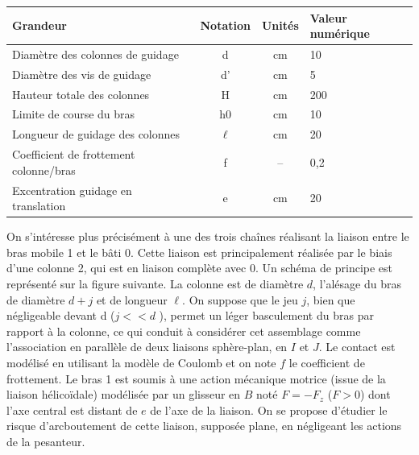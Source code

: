 \documentclass[10pt,fleqn]{article} %
\begin{document}

\vspace{5cm}
\pagestyle{fancy}
\thispagestyle{plain}


\def\columnseprulecolor{\color{ocre}}
\setlength{\columnseprule}{0.4pt} 

\begin{multicols}{2}

\footnotesize
\noindent\begin{center}
\begin{tabular}{|p{2.6cm}|c|c|p{1.5cm}|}
\hline
Grandeur & Notation & Unités & Valeur numérique \\ \hline
Diamètre des colonnes  de guidage & d & cm & 10 \\ \hline
Diamètre des vis de guidage & d' & cm & 5 \\ \hline
Hauteur totale des colonnes & H & cm & 200 \\ \hline
Limite de course du bras & h0 & cm & 10 \\ \hline
Longueur de guidage des colonnes & $\ell$  & cm & 20 \\ \hline
Coefficient de frottement colonne/bras & f & -- & 0,2 \\ \hline
Excentration guidage en translation & e & cm & 20 \\ \hline
\end{tabular}
\end{center}

\normalsize

On s’intéresse plus précisément à une des trois chaînes réalisant la liaison entre le bras mobile 1 et le bâti
0. 
Cette liaison est principalement réalisée par le biais d’une colonne 2, qui est en liaison complète avec 0. Un schéma de principe est représenté sur la figure suivante. La colonne est de diamètre $d$, l’alésage du bras de diamètre
$d + j$ et  de longueur $\ell$. On suppose que le jeu $j$, bien que négligeable devant d ($j  << d$ ), permet un léger
basculement du bras par rapport à la colonne, ce qui conduit à considérer cet assemblage comme l’association en parallèle de deux liaisons sphère-plan, en $I$ et $J$. Le contact est modélisé en utilisant la modèle de Coulomb et on note $f$  le coefficient  de frottement. Le bras 1 est soumis à une action mécanique motrice (issue de la
liaison hélicoïdale) modélisée par un glisseur en $B$ noté $F = -F_z$ ($F > 0$) dont l’axe central est distant de $e$
de l’axe de la liaison. On se propose  d’étudier le risque d’arcboutement  de cette liaison, supposée plane, en négligeant les actions de la pesanteur.


\end{multicols}
\end{document}
